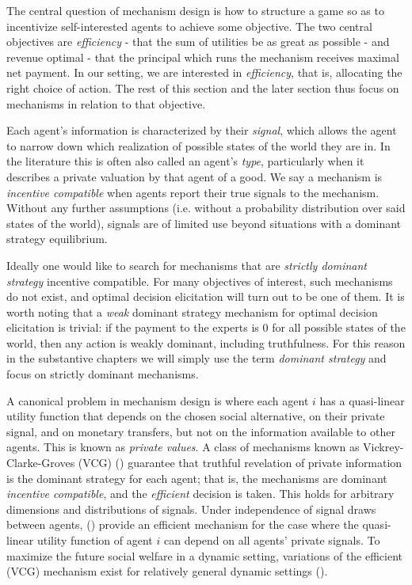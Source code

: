 The central question of mechanism design is how to structure a game so as to incentivize self-interested agents to achieve some objective.
The two central objectives are \emph{efficiency} - that the sum of utilities be as great as possible - and revenue optimal - that the principal which runs the mechanism receives maximal net payment.
In our setting, we are interested in \emph{efficiency}, that is, allocating the right choice of action. The rest of this section and the later section thus focus on mechanisms in relation to that objective.

Each agent's information is characterized by their \emph{signal}, which allows the agent to narrow down which realization of possible states of the world they are in. In the literature this is often also called an agent's \emph{type}, particularly when it describes a private valuation by that agent of a good.
We say a mechanism is \emph{incentive compatible} when agents report their true signals to the mechanism. 
Without any further assumptions (i.e. without a probability distribution over said states of the world), signals are of limited use beyond situations with a dominant strategy equilibrium.

Ideally one would like to search for mechanisms that are \emph{strictly dominant strategy} incentive compatible.
For many objectives of interest, such mechanisms do not exist, and optimal decision elicitation will turn out to be one of them.
It is worth noting that a \emph{weak} dominant strategy mechanism for optimal decision elicitation is trivial: if the payment to the experts is 0 for all possible states of the world, then any action is weakly dominant, including truthfulness. 
For this reason in the substantive chapters we will simply use the term \emph{dominant strategy} and focus on strictly dominant mechanisms. 

A canonical problem in mechanism design is where each agent $i$ has a quasi-linear utility function that depends on the chosen social alternative, on their private signal, and on monetary transfers, but not on the information available to other agents.
This is known as \emph{private values}.
A class of mechanisms known as Vickrey-Clarke-Groves (VCG)  (\cite{vickrey1961,clarke1971,groves1973}) guarantee that truthful revelation of private information is the dominant strategy for each agent; that is, the mechanisms are dominant \emph{incentive compatible}, and the \emph{efficient} decision is taken. 
This holds for arbitrary dimensions and distributions of signals.
Under independence of signal draws between agents, (\cite{jehiel2001efficient}) provide an efficient mechanism for the case where the quasi-linear utility function of agent $i$ can depend on all agents' private signals. 
To maximize the future social welfare in a dynamic setting, variations of the efficient (VCG) mechanism exist for relatively general dynamic settings (\cite{bergemann2010dynamic,parkes2003van,athey2007designing}).


